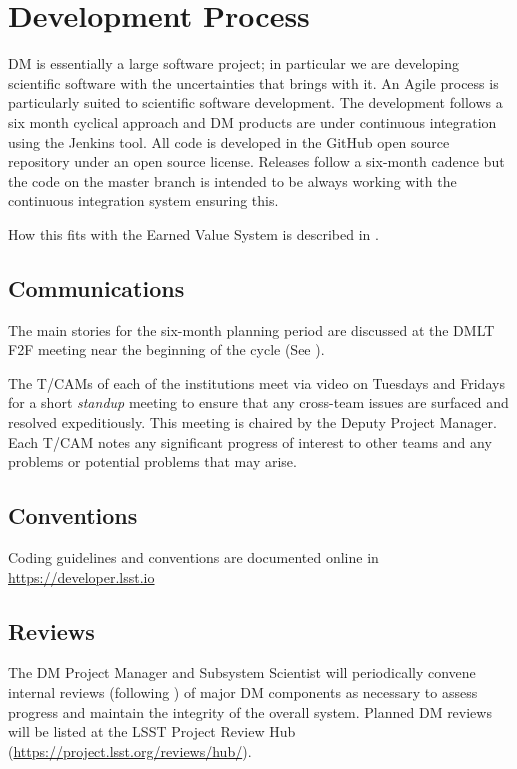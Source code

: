 \section{Development Process} \label{sect:devproc}

DM is essentially a large software project; in particular we are developing scientific software with the uncertainties that brings with it.
An Agile process \citep{it:agile} is particularly suited to scientific software development.  The development follows a six month  cyclical approach and  DM  products are under continuous
integration using the Jenkins tool. All code is developed in the GitHub open source repository under an open source license.
Releases follow a six-month cadence but the code on the master branch is intended to be always working with the continuous integration system ensuring this.

How this fits with the Earned Value System is described in .


\subsection{Communications}

The main stories for the six-month planning period are discussed at the DMLT F2F meeting near the beginning of the cycle (See ).

The T/CAMs of each of the institutions meet via video on Tuesdays and Fridays for a short \emph{standup} meeting to ensure that any cross-team issues are surfaced and resolved expeditiously.
This meeting is chaired by the Deputy Project Manager.
Each T/CAM notes any significant progress of interest to other teams and any problems or potential problems that may arise.

\subsection{Conventions}
Coding guidelines and conventions are documented online in \url{https://developer.lsst.io}

\subsection{Reviews} \label{sect:reviews}

The DM Project Manager and Subsystem Scientist will periodically convene internal reviews (following )
of major DM components as necessary to assess progress and maintain the integrity of the overall system. Planned DM reviews will be listed at the LSST Project Review Hub (\url{https://project.lsst.org/reviews/hub/}).

